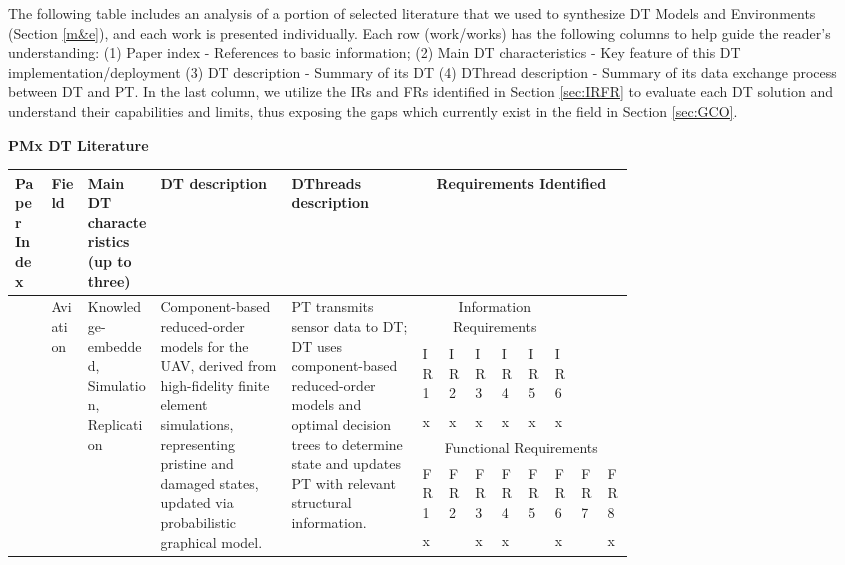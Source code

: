 \documentclass[runningheads]{llncs}
\begin{document}
The following table includes an analysis of a portion of selected literature that we used to synthesize DT Models and Environments (Section \ref{m&e}), and each work is presented individually. Each row (work/works) has the following columns to help guide the reader's understanding: (1) Paper index - References to basic information; (2) Main DT characteristics - Key feature of this DT implementation/deployment (3) DT description - Summary of its DT (4) DThread description - Summary of its data exchange process between DT and PT. In the last column, we utilize the IRs and FRs identified in Section \ref{sec:IRFR} to evaluate each DT solution and understand their capabilities and limits, thus exposing the gaps which currently exist in the field in Section \ref{sec:GCO}.

\setlength\tabcolsep{6pt}
\begin{landscape}
\newpage
\textbf{PMx DT Literature}
\vspace{2mm}
\begin{small}
    \begin{longtable}[htp]{p{0.05\linewidth}p{0.05\linewidth}p{0.1\linewidth}p{0.18\linewidth}p{0.18\linewidth}p{0.02\linewidth}p{0.02\linewidth}p{0.02\linewidth}p{0.02\linewidth}p{0.02\linewidth}p{0.02\linewidth}p{0.02\linewidth}p{0.02\linewidth}}
    \bottomrule
        Paper Index & Field & Main DT characteristics (up to three) & DT description & DThreads description & \multicolumn{8}{c}{Requirements Identified} \\\bottomrule

        
        \vspace{3mm}
        \multirow{6}{=}{\cite{kapteyn2022data}} & \multirow{6}{=}{Aviation} &  \multirow{6}{=}{Knowledge-embedded, Simulation, Replication} & \multirow{6}{=}{Component-based reduced-order models for the UAV, derived from high-fidelity finite element simulations, representing pristine and damaged states, updated via probabilistic graphical model.} & \multirow{6}{=}{PT transmits sensor data to DT; DT uses component-based reduced-order models and optimal decision trees to determine state and updates PT with relevant structural information.} & \multicolumn{6}{c}{Information Requirements} &  \\\cmidrule{6-11}
        
        & & & & & IR1 & IR2 & IR3 & IR4 & IR5 & IR6 & & \\\cmidrule{6-11}
        & & & & & x  & x  & x &  x & x  & x  & & \\\cmidrule{6-13}
        \vspace{3mm}
        & & & & & \multicolumn{8}{c}{Functional Requirements} \\\cmidrule{6-13}
        & & & & & FR1 & FR2 & FR3 & FR4 & FR5 & FR6 & FR7 & FR8 \\\cmidrule{6-13}
        & & & & & x &  & x & x &  & x & & x\\\bottomrule



\end{longtable}
\end{small}
\end{landscape}
\end{document}

